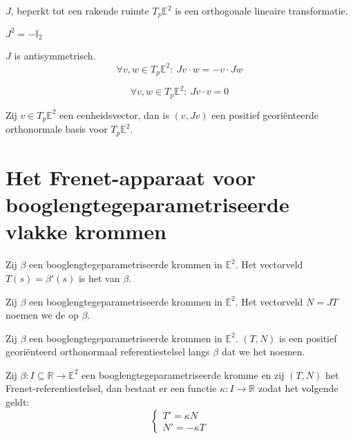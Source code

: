 \documentclass[main.tex]{subfiles}
\begin{document}
\begin{st}
  $J$, beperkt tot een rakende ruimte $T_{p}\mathbb{E}^{2}$  is een orthogonale lineaire transformatie.
\end{st}

\begin{st}
  $J^{2} = -\mathbb{I}_{2}$
\end{st}

\begin{st}
  $J$ is antisymmetrisch.
  \[ \forall v,w \in T_{p}\mathbb{E}^{2}:\ Jv\cdot w = -v \cdot Jw \]
\end{st}

\begin{st}
  \[ \forall v,w \in T_{p}\mathbb{E}^{2}:\ Jv\cdot v = 0 \]
\end{st}

\begin{st}
  Zij $v\in T_{p}\mathbb{E}^{2}$ een eenheidsvector, dan is $(v,Jv)$ een positief geori\"enteerde orthonormale basis voor $T_{p}\mathbb{E}^{2}$.
\end{st}

\section{Het Frenet-apparaat voor booglengtegeparametriseerde vlakke krommen}
\label{sec:het-frenet-apparaat}

\begin{de}
  Zij $\beta$ een booglengtegeparametriseerde krommen in $\mathbb{E}^{2}$.
  Het vectorveld $T(s) = \beta'(s)$ is het  van $\beta$.
\end{de}

\begin{de}
  Zij $\beta$ een booglengtegeparametriseerde krommen in $\mathbb{E}^{2}$.
  Het vectorveld $N = JT$ noemen we de  op $\beta$.
\end{de}

\begin{de}
  Zij $\beta$ een booglengtegeparametriseerde krommen in $\mathbb{E}^{2}$.
  $(T,N)$ is een positief geori\"enteerd orthonormaal referentiestelsel langs $\beta$ dat we het  noemen.
\end{de}

\begin{st}
  Zij $\beta: I \subseteq \mathbb{R} \rightarrow \mathbb{E}^{2}$ een booglengtegeparametriseerde kromme en zij $(T,N)$ het Frenet-referentiestelsel, dan bestaat er een functie $\kappa: I \rightarrow \mathbb{R}$ zodat het volgende geldt:
  \[ 
  \left\{
    \begin{array}{cl}
      T' = \kappa N\\
      N' = -\kappa T
    \end{array}
  \right.
  \]
\end{st}
\end{document}
